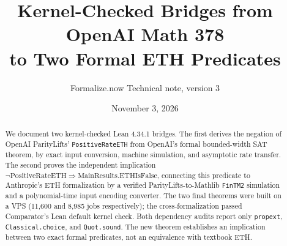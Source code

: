 \documentclass[11pt,letterpaper]{article}
\title{\vspace{-1cm}\bfseries Kernel-Checked Bridges from OpenAI Math 378\\to Two Formal ETH Predicates}
\author{Formalize.now \quad\textnormal{Technical note, version 3}}
\date{November 3, 2026}
\newcommand{\lean}[1]{\texttt{#1}}
\begin{document}
\maketitle
\begin{abstract}
We document two kernel-checked Lean 4.34.1 bridges. The first derives the negation of OpenAI ParityLifts' \lean{PositiveRateETH} from OpenAI's formal bounded-width SAT theorem, by exact input conversion, machine simulation, and asymptotic rate transfer. The second proves the independent implication $\neg\mathrm{PositiveRateETH}\Rightarrow\mathrm{MainResults.ETHIsFalse}$, connecting this predicate to Anthropic's ETH formalization by a verified ParityLifts-to-Mathlib \lean{FinTM2} simulation and a polynomial-time input encoding converter. The two final theorems were built on a VPS (11,600 and 8,985 jobs respectively); the cross-formalization passed Comparator's Lean default kernel check. Both dependency audits report only \lean{propext}, \lean{Classical.choice}, and \lean{Quot.sound}. The new theorem establishes an implication between two exact formal predicates, not an equivalence with textbook ETH.
\end{abstract}
\end{document}
